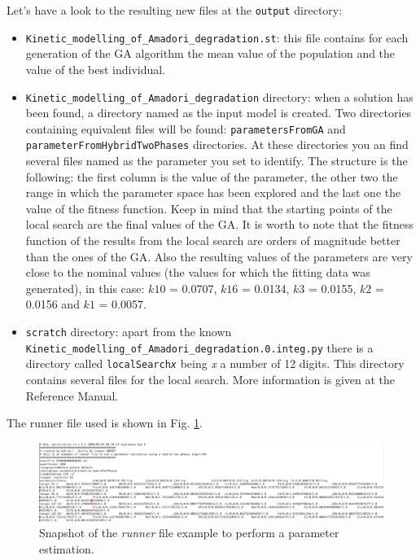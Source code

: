 \documentclass[a4paper, 11pt]{article}
\begin{document}
  Let's have a look to the resulting new files at the \texttt{output} directory:
  \begin{itemize}
    \item
      \texttt{Kinetic\_modelling\_of\_Amadori\_degradation.st}: this file contains for each generation of the GA algorithm the mean value of the population and the value of the best individual.
    \item 
      \texttt{Kinetic\_modelling\_of\_Amadori\_degradation} directory: when a solution has been found, a directory named as the input model is created. 
      Two directories containing equivalent files will be found: \texttt{parametersFromGA} and \texttt{parameterFromHybridTwoPhases} directories.
      At these directories you an find several files named as the parameter you set to identify. 
      The structure is the following: the first column is the value of the parameter, the other two the range in which the parameter space has been explored and the last one the value of the fitness function. 
      Keep in mind that the starting points of the local search are the final values of the GA.
      It is worth to note that the fitness function of the results from the local search are orders of magnitude  better than the ones of the GA.
      Also the resulting values of the parameters are very close to the nominal values (the values for which the fitting data was generated), in this case: $k10$ = 0.0707, $k16$ = 0.0134, $k3$ = 0.0155, $k2$ = 0.0156 and $k1$ = 0.0057.
      \item
	\texttt{scratch} directory: apart from the known \\ \texttt{Kinetic\_modelling\_of\_Amadori\_degradation.0.integ.py} there is a directory called \texttt{localSearch\textit{x}} being \textit{x} a number of 12 digits. 
	This directory contains several files for the local search.  
	More information is given at the Reference Manual.
  \end{itemize}
  The runner file used is shown in Fig. \ref{singleOptimisationRunner}.
  \begin{figure}[t]
    \begin{center}
      \includegraphics[scale=.38]{figures/optimisationRunner.eps}
      \caption{Snapshot of the \emph{runner} file example to perform a parameter estimation.}
      \label{singleOptimisationRunner}
    \end{center}
  \end{figure}
\end{document}
